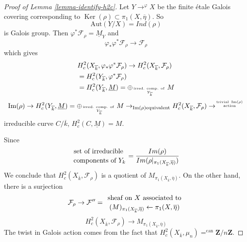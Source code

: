 \documentclass{stacks-project}
\theoremstyle{plain}
\theoremstyle{definition}
\theoremstyle{remark}
\numberwithin{equation}{subsection}
\def\Ker{\mathop{\mathrm{Ker}}}
\def\Im{\mathop{\mathrm{Im}}}
\begin{document}
\begin{proof}[Proof of Lemma \ref{lemma-identify-h2c}]
Let $Y\to^{\varphi}X$ be the finite \'etale Galois covering
corresponding to $\Ker(\rho) \subset \pi_1(X, \overline\eta)$. So
$$
\text{Aut}(Y/X)=Ind(\rho)
$$
is Galois group. Then $\varphi^*\mathcal{F}_\rho =\underline M_Y$ and
$$
\varphi_*\varphi^*\mathcal{F}_\rho\to \mathcal{F}_\rho
$$
which gives
\begin{align*}
& H_c^2(X_{\overline{k}}, \varphi_*\varphi^*\mathcal{F}_\rho) \to
H_c^2(X_{\overline{k}}, \mathcal{F}_\rho)\\
& =H_c^2(Y_{\overline{k}}, \varphi^*\mathcal{F}_\rho)\\
& =H_c^2(Y_{\overline{k}}, \underline M) = \oplus_{\text{irred.
comp. of } \atop Y_{\overline{k}}}M
\end{align*}
$$
\Im(\rho) \to H_c^2(Y_{\overline{k}}, \underline M) =
\oplus_{\text{irred. comp. of } \atop Y_{\overline{k}}}
M \to_{\Im(\rho) \text{equivalent}} H_c^2(X_{\overline{k}},
\mathcal{F}_{\rho}) \to^{\text{trivial }
\Im(\rho) \atop \text{action}}
$$
irreducible curve $C/\overline{k}$, $H_c^2(C, \underline M)=M$.

\medskip\noindent
Since
$$
{\text{set of irreducible } \atop \text{components of }Y_k} =
\frac{Im(\rho)}{Im(\rho|_{\pi_1(X_{\overline{k}}, \overline \eta)})}
$$
We conclude that $H_c^2(X_{\overline{k}}, \mathcal{F}_\rho)$ is a
quotient of $M_{\pi_1(X_{\overline{k}}, \overline \eta)}$. On the other hand,
there is a surjection
$$
\mathcal{F}_\rho\to \mathcal{F}'' = {\text{ sheaf on }
X\text{ associated to } \atop (M)_{\pi_1(X_{\overline{k}}, \overline
\eta)}\leftarrow\pi_1(X, \overline \eta)}
$$
$$
H_c^2(X_{\overline{k}}, \mathcal{F}_\rho)\to
M_{\pi_1(X_{\overline{k}}, \overline\eta)}
$$
The twist in Galois action comes from the fact that
$H_c^2(X_{\overline{k}}, \mu_n)=^{\text{can}} \mathbf{Z}/n\mathbf{Z}$.
\end{proof}
\end{document}
